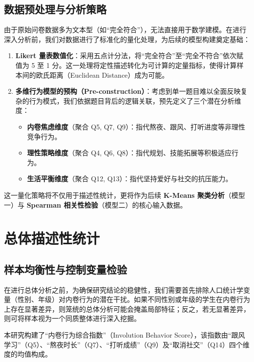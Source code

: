 \documentclass[win,thesis]{hustreport} %
\begin{document}
\subsection{数据预处理与分析策略}
\label{sec:methodology}
由于原始问卷数据多为文本型（如“完全符合”），无法直接用于数学建模。在进行深入分析前，我们对数据进行了标准化的量化处理，为后续的模型构建奠定基础：

\begin{enumerate}
	\item \textbf{Likert 量表数值化}：采用五点计分法，将“完全符合”至“完全不符合”依次赋值为 5 至 1 分。这一处理将定性描述转化为可计算的定量指标，使得计算样本间的欧氏距离（Euclidean Distance）成为可能。
	\item \textbf{多维行为模型的预构（Pre-construction）}：考虑到单一题目难以全面反映复杂的行为模式，我们依据题目背后的逻辑关联，预先定义了三个潜在分析维度：
	\begin{itemize}
		\item \textbf{内卷焦虑维度}（聚合 Q5, Q7, Q9）：指代熬夜、跟风、打听进度等非理性竞争行为。
		\item \textbf{理性策略维度}（聚合 Q4, Q6, Q8）：指代规划、技能拓展等积极适应行为。
		\item \textbf{生活平衡维度}（聚合 Q12, Q13）：指代坚持爱好与社交的抗压能力。
	\end{itemize}
\end{enumerate}

这一量化策略将不仅用于描述性统计，更将作为后续 \textbf{K-Means 聚类分析}（模型一）与 \textbf{Spearman 相关性检验}（模型二）的核心输入数据。


\newpage
\section{总体描述性统计}

\subsection{样本均衡性与控制变量检验}
在进行总体分析之前，为确保研究结论的稳健性，我们需要首先排除人口统计学变量（性别、年级）对内卷行为的潜在干扰。如果不同性别或年级的学生在内卷行为上存在显著差异，则笼统的总体分析可能会掩盖局部特征；反之，若无显著差异，则可将样本视为一个同质整体进行深入挖掘。

本研究构建了“内卷行为综合指数”（Involution Behavior Score），该指数由“跟风学习”（Q5）、“熬夜时长”（Q7）、“打听成绩”（Q9）及“取消社交”（Q14）四个维度的均值构成。
\end{document}
